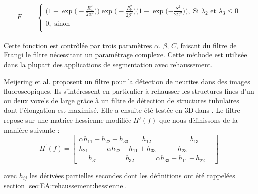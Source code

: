 \begin{align}
  F & = \begin{cases} 
                \big(1-\exp\big(-\frac{R_a^2}{2\alpha^2}\big)\big) \exp\big(-\frac{R_b^2}{2\beta^2}\big)\big(1-\exp(-\frac{S^2}{2C^2}\big)\big), \textrm{~Si~} \lambda_2 \textrm{~et~} \lambda_3 \leqslant 0   \\
                0, \textrm{ sinon} \\
              \end{cases}
\end{align}

Cette fonction est contrôlée par trois paramètres $\alpha$, $\beta$, $C$, faisant du filtre de Frangi le filtre nécessitant un paramétrage complexe. Cette méthode est utilisée dans la plupart des applications de segmentation avec rehaussement.


Meijering et al. \cite{Meijering2004_neurite_vesselness} proposent un filtre pour la détection de neurites dans des images fluoroscopiques. Ils s'intéressent en particulier à rehausser les structures fines d'un ou deux voxels de large grâce à un filtre de détection de structures tubulaires dont l'élongation est maximisé. Elle a ensuite été testée en 3D dans \cite{Obara2012_phase}. Le filtre repose sur une matrice hessienne modifiée $H'(f)$ que nous définissons de la manière suivante :
\begin{equation}
    H^{'}(f)=
    \begin{bmatrix}
    \alpha h_{11}+ h_{22} +   h_{33} ~~~~~~~~~ h_{12} ~~~~~~~~~~~~~~~~~~~~~~~~~ h_{13} ~~~~~~~~ \\
    h_{21} ~~~~~~~~~~~~ \alpha h_{22} + h_{11} +  h_{33} ~~~~~~~~~~~~~~ h_{23} \\
    ~~~~~~ h_{31} ~~~~~~~~~~~~~~~~~~ h_{32} ~~~~~~~~~~~~~~ \alpha h_{33} + h_{11} +  h_{22}
    \end{bmatrix}
\end{equation}

avec $h_{ij}$ les dérivées partielles secondes dont les définitions ont été rappelées section \ref{sec:EA:rehaussement:hessienne}.

